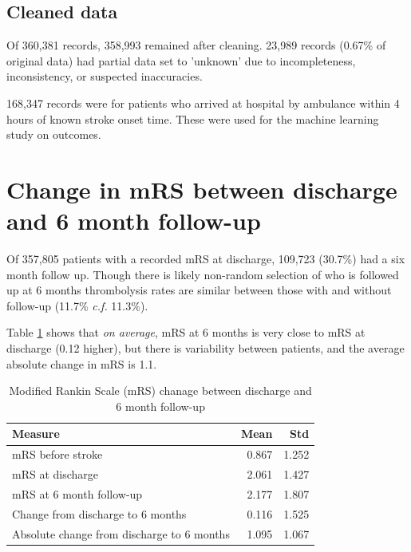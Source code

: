 \subsection{Cleaned data}

Of 360,381 records, 358,993 remained after cleaning. 23,989 records (0.67\% of original data) had partial data set to 'unknown' due to incompleteness, inconsistency, or suspected inaccuracies.

168,347 records were for patients who arrived at hospital by ambulance within 4 hours of known stroke onset time. These were used for the machine learning study on outcomes.

\newpage

\section{Change in mRS between discharge and 6 month follow-up}

Of 357,805 patients with a recorded mRS at discharge, 109,723 (30.7\%) had a six month follow up. Though there is likely non-random selection of who is followed up at 6 months thrombolysis rates are similar between those with and without follow-up (11.7\% \textit{c.f.} 11.3\%).

Table \ref{tab:mrs_change} shows that \textit{on average}, mRS at 6 months is very close to mRS at discharge (0.12 higher), but there is variability between patients, and the average absolute change in mRS is 1.1.

\begin{table}[ht]
\centering
\caption{Modified Rankin Scale (mRS) chanage between discharge and 6 month follow-up}
\label{tab:mrs_summary}
\begin{tabular}{lrr}
\toprule
\textbf{Measure} & \textbf{Mean} & \textbf{Std} \\
\midrule
mRS before stroke                          & 0.867 & 1.252 \\
mRS at discharge                           & 2.061 & 1.427 \\
mRS at 6 month follow-up                   & 2.177 & 1.807 \\
Change from discharge to 6 months         & 0.116 & 1.525 \\
Absolute change from discharge to 6 months & 1.095 & 1.067 \\
\bottomrule
\end{tabular}
\label{tab:mrs_change}
\end{table}

